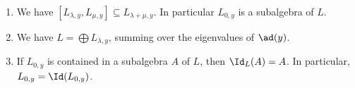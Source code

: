 \begin{enumerate}[label=(\roman*)]
	\item We have $[L_{\lambda, y}, L_{\mu, y}] \subseteq L_{\lambda+\mu, y}$.
		In particular $L_{0, y}$ is a subalgebra of $L$.
	\item We have $L = \bigoplus L_{\lambda, y}$, summing over the eigenvalues
		of $\ad(y)$.
	\item If $L_{0, y}$ is contained in a subalgebra $A$ of $L$, then
		$\Id_L(A) = A$. In particular, $L_{0, y} = \Id(L_{0, y})$.
\end{enumerate}
